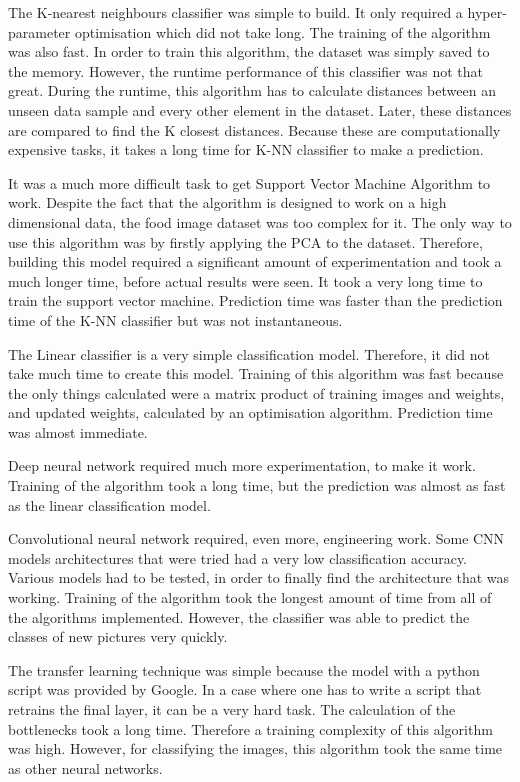 The K-nearest neighbours classifier was simple to build. It only required a hyper-parameter optimisation which did not take long. The training of the algorithm was also fast. In order  to train this algorithm, the dataset was simply saved to the memory. However, the runtime performance of this classifier was not that great. During the runtime, this algorithm has to calculate  distances between an unseen data sample  and every other element in the dataset. Later, these distances are compared to find the K closest distances. Because these are  computationally expensive tasks, it takes a long time for K-NN classifier to make a prediction.

It was a much more difficult task to get Support Vector Machine Algorithm to work. Despite the fact that the algorithm is designed to work on a high dimensional data,  the food image dataset was too complex for it. The only way to use this algorithm was by firstly applying the PCA to the dataset. Therefore, building this model required a significant amount of experimentation and took a much longer time, before actual results were seen. It took a very long time to train the support vector machine. Prediction time was faster than the prediction time of the K-NN classifier but was not instantaneous.

The Linear classifier is a very simple classification model. Therefore, it did not take much time to create this model. Training of this algorithm was fast because the only things calculated were a matrix product of training images and weights, and updated weights, calculated by an optimisation algorithm. Prediction time was almost immediate.

Deep neural network required much more experimentation, to make it work. Training of the algorithm took a long time, but the prediction was almost as fast as the linear classification model.

Convolutional neural network required, even more, engineering work. Some CNN models architectures that were tried had a very low classification accuracy. Various models had to be tested, in order to finally find the architecture that was working.  Training of the algorithm took the longest amount of time from all of the algorithms implemented. However, the classifier was able to predict the classes of new pictures very quickly.

The transfer learning technique was simple because the model with a python script was provided by Google. In a case where one has to write a script that retrains the final layer,  it can be a very hard task. The calculation of the bottlenecks took a long time. Therefore a training complexity of this algorithm was high.  However, for classifying the images, this algorithm took the same time as other neural networks.

